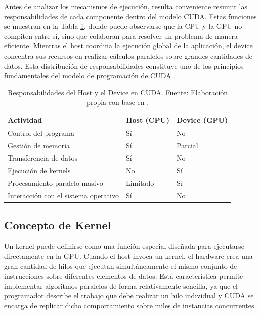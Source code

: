 Antes de analizar los mecanismos de ejecución, resulta conveniente resumir las responsabilidades de cada componente dentro del modelo CUDA. Estas funciones se muestran en la Tabla \ref{tab:host_device}, donde puede observarse que la CPU y la GPU no compiten entre sí, sino que colaboran para resolver un problema de manera eficiente. Mientras el host coordina la ejecución global de la aplicación, el device concentra sus recursos en realizar cálculos paralelos sobre grandes cantidades de datos. Esta distribución de responsabilidades constituye uno de los principios fundamentales del modelo de programación de CUDA \cite{hostdevice,nvidiaProgrammingGuide}.

\begin{table}[H]
\centering
\caption{Responsabilidades del Host y el Device en CUDA. Fuente: Elaboración propia con base en \cite{hostdevice,nvidiaProgrammingGuide}.}
\label{tab:host_device}
\begin{tabular}{|p{5cm}|p{3cm}|p{3cm}|}
\hline
\textbf{Actividad} & \textbf{Host (CPU)} & \textbf{Device (GPU)} \\
\hline
Control del programa & Sí & No \\
\hline
Gestión de memoria & Sí & Parcial \\
\hline
Transferencia de datos & Sí & No \\
\hline
Ejecución de kernels & No & Sí \\
\hline
Procesamiento paralelo masivo & Limitado & Sí \\
\hline
Interacción con el sistema operativo & Sí & No \\
\hline
\end{tabular}
\end{table}

\subsection{Concepto de Kernel}

Un kernel puede definirse como una función especial diseñada para ejecutarse directamente en la GPU. Cuando el host invoca un kernel, el hardware crea una gran cantidad de hilos que ejecutan simultáneamente el mismo conjunto de instrucciones sobre diferentes elementos de datos. Esta característica permite implementar algoritmos paralelos de forma relativamente sencilla, ya que el programador describe el trabajo que debe realizar un hilo individual y CUDA se encarga de replicar dicho comportamiento sobre miles de instancias concurrentes.

